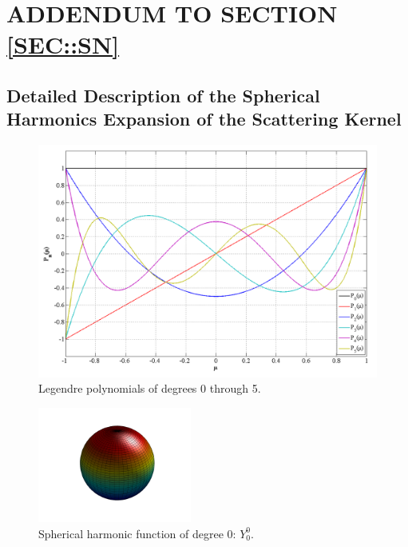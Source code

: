 %
%
%

\chapter{\uppercase{Addendum to Section \ref{sec::Sn}}}
\label{sec::appendix_SN}

\section{Detailed Description of the Spherical Harmonics Expansion of the Scattering Kernel}
\label{sec::appendix_SN_Scattering}

\begin{figure}
\label{fig::Legendre_Polynomials}
\centering
\includegraphics[width=\textwidth]{figures/appendices/legendre_polynomials.png}
\caption{Legendre polynomials of degrees 0 through 5.}
\end{figure}

\pagebreak

\begin{figure}
\label{fig::Sn_Y0}
\centering
\includegraphics[width=0.45\textwidth]{figures/appendices/Y_0_0.png}
\caption{Spherical harmonic function of degree 0: $Y_{0}^{0}$.}
\end{figure}

